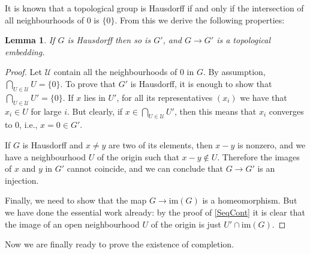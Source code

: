 \documentclass[12pt,a4paper,leqno]{article}
\newcommand{\im}{\mathrm{im}}
\newcommand{\fref}[1]{\hyperref[{#1}]{\ref*{#1}}}
\theoremstyle{plain}
\newtheorem{lem}[theo]{Lemma}
\theoremstyle{definition}
\theoremstyle{remark}
\begin{document}
It is known that a topological group is Hausdorff if and only if the intersection of all neighbourhoods of $0$ is $\{ 0 \}$. From this we derive the following properties:

\begin{lem}
If $G$ is Hausdorff then so is $G'$, and $G \to G'$ is a topological embedding.
\end{lem}
\begin{proof}
Let $\mathcal U$ contain all the neighbourhoods of $0$ in $G$. By assumption, $\bigcap_{U \in \mathcal U} U = \{ 0 \}$. To prove that $G'$ is Hausdorff, it is enough to show that $\bigcap_{U \in \mathcal U} U' = \{ 0 \}$. If $x$ lies in $U'$, for all its representatives $(x_i)$ we have that $x_i \in U$ for large $i$. But clearly, if $x \in \bigcap_{U \in \mathcal U} U'$, then this means that $x_i$ converges to 0, i.e., $x = 0 \in G'$.

If $G$ is Hausdorff and $x \not = y$ are two of its elements, then $x-y$ is nonzero, and we have a neighbourhood $U$ of the origin such that $x-y \not \in U$. Therefore the images of $x$ and $y$ in $G'$ cannot coincide, and we can conclude that $G \to G'$ is an injection. 

Finally, we need to show that the map $G \to \im (G)$ is a homeomorphism. But we have done the essential work already: by the proof of \fref{SeqCont} it is clear that the image of an open neighbourhood $U$ of the origin is just $U' \cap \im (G)$.
\end{proof}

Now we are finally ready to prove the existence of completion.
\end{document}
